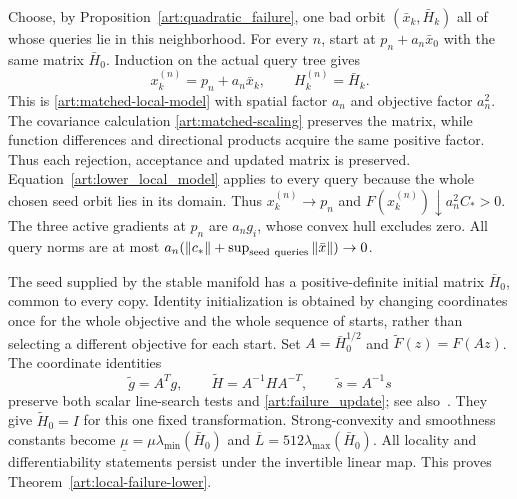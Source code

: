 Choose, by Proposition~\ref{art:quadratic_failure}, one bad orbit
$(\bar x_k,\bar H_k)$ all of whose queries lie in this neighborhood.
For every $n$, start at $p_n+a_n\bar x_0$ with the same matrix
$\bar H_0$. Induction on the actual query tree gives
\[
 x_k^{(n)}=p_n+a_n\bar x_k,\qquad H_k^{(n)}=\bar H_k.
\]
This is \eqref{art:matched-local-model} with spatial factor $a_n$
and objective factor $a_n^2$. The covariance calculation
\eqref{art:matched-scaling} preserves the matrix, while function
differences and directional products acquire the same positive factor.
Thus each rejection, acceptance and updated matrix is preserved. Equation~\eqref{art:lower_local_model} applies to every
query because the whole chosen seed orbit lies in its domain.
Thus $x_k^{(n)}\to p_n$ and
$F(x_k^{(n)})\downarrow a_n^2C_*>0$. The three active gradients at
$p_n$ are $a_ng_i$, whose convex hull excludes zero.
All query norms are at most
$a_n(\|c_*\|+\sup_{\rm seed\ queries}\|\bar x\|)\to0$.

The seed supplied by the stable manifold has a positive-definite initial
matrix $\bar H_0$, common to every copy. Identity initialization is
obtained by changing coordinates once for the whole objective and the
whole sequence of starts, rather than selecting a different objective
for each start. Set $A=\bar H_0^{1/2}$ and $\widetilde F(z)=F(Az)$.
The coordinate identities
\[
 \widetilde g=A^Tg,\qquad \widetilde H=A^{-1}HA^{-T},\qquad
 \widetilde s=A^{-1}s
\]
preserve both scalar line-search tests and
\eqref{art:failure_update}; see also~\cite[Section~2]{LO}.
They give $\widetilde H_0=I$ for this one fixed transformation.
Strong-convexity and smoothness constants become
$\underline\mu=\mu\lambda_{\min}(\bar H_0)$ and
$\overline L=512\lambda_{\max}(\bar H_0)$.
All locality and differentiability statements persist under the
invertible linear map. This proves
Theorem~\ref{art:local-failure-lower}.
